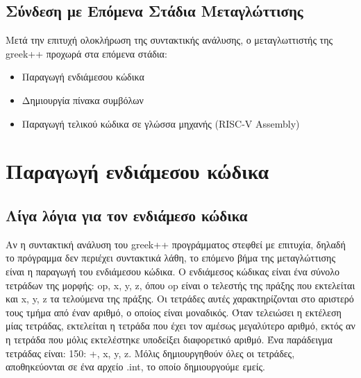 \documentclass[12pt,a4paper]{article}
\begin{document}
        \subsection{Σύνδεση με Επόμενα Στάδια Μεταγλώττισης}
            Μετά την επιτυχή ολοκλήρωση της συντακτικής ανάλυσης, ο μεταγλωττιστής της greek++ προχωρά στα επόμενα στάδια:
            \begin{itemize}
                \item Παραγωγή ενδιάμεσου κώδικα
                \item Δημιουργία πίνακα συμβόλων
                \item Παραγωγή τελικού κώδικα σε γλώσσα μηχανής (RISC-V Assembly)
            \end{itemize}



    \section{Παραγωγή ενδιάμεσου κώδικα}

\subsection{Λίγα λόγια για τον ενδιάμεσο κώδικα}
Αν η συντακτική ανάλυση του greek++ προγράμματος στεφθεί με επιτυχία, δηλαδή το πρόγραμμα δεν περιέχει συντακτικά λάθη, το επόμενο βήμα της μεταγλώττισης είναι η παραγωγή του ενδιάμεσου κώδικα. Ο ενδιάμεσος κώδικας είναι ένα σύνολο τετράδων της μορφής: op, x, y, z, όπου op είναι ο τελεστής της πράξης που εκτελείται και x, y, z τα τελούμενα της πράξης. Οι τετράδες αυτές χαρακτηρίζονται στο αριστερό τους τμήμα από έναν αριθμό, ο οποίος είναι μοναδικός. Όταν τελειώσει η εκτέλεση μίας τετράδας, εκτελείται η τετράδα που έχει τον αμέσως μεγαλύτερο αριθμό, εκτός αν η τετράδα που μόλις εκτελέστηκε υποδείξει διαφορετικό αριθμό. Ένα παράδειγμα τετράδας είναι: 150: +, x, y, z. Μόλις δημιουργηθούν όλες οι τετράδες, αποθηκεύονται σε ένα αρχείο .int, το οποίο δημιουργούμε εμείς.
\end{document}
